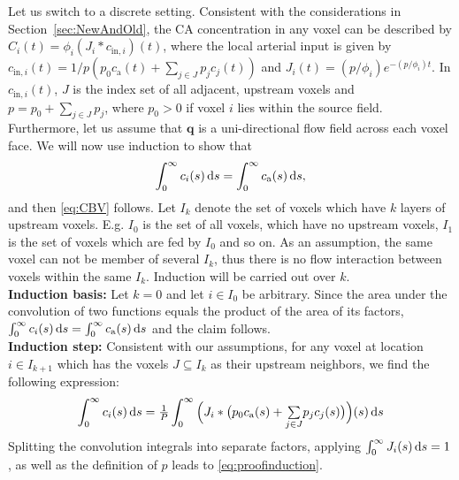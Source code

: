 \documentclass[journal,twocolumn]{IEEEtran}
\newcommand{\ca}{c_\mathrm{a}}
\newcommand{\vq}{\mathbf{q}}
\begin{document}
	Let us switch to a discrete setting.
	Consistent with the considerations in Section~\ref{sec:NewAndOld}, the CA concentration in any voxel can be described by $C_i(t) = \phi_i(J_i\ast c_{\mathrm{in},i})(t)$, where the local arterial input is given by
		$c_{\mathrm{in},i}(t) =1/p(p_0 \ca(t) + \sum_{j \in J} p_jc_j(t))$ and $J_i(t)=(p/\phi_i)e^{- (p/\phi_i)t}$.
	In $c_{\mathrm{in},i}(t)$, $J$ is the index set of all adjacent, upstream voxels and $p=p_0 + \sum_{j\in J} p_j$, where $p_0>0$ if voxel $i$ lies within the source field.
	Furthermore, let us assume that $\vq$ is a uni-directional flow field across each voxel face.
		We will now use induction to show that 
		\begin{equation}
		\int_0^\infty c_i(s) \diffint s = \int_0^\infty \ca(s) \diffint s,
		\label{eq:proofinduction}
		\end{equation} 
		and then \eqref{eq:CBV} follows.
		Let $I_k$ denote the set of voxels which have $k$ layers of upstream voxels.
		E.g. $I_0$ is the set of all voxels, which have no upstream voxels, $I_1$ is the set of voxels which are fed by $I_0$ and so on. As an assumption, the same voxel can not be member of several $I_k$, thus there is no flow interaction between voxels within the same $I_k$.
		Induction will be carried out over $k$.\\
		\textbf{Induction basis:}
		Let $k=0$ and let $i \in I_0$ be arbitrary.
		Since the area under the convolution of two functions equals the product of the area of its factors, $\int_0^\infty c_i(s) \diffint s = \int_0^\infty \ca(s) \diffint s$ and the claim follows.\\
		\textbf{Induction step:}
		Consistent with our assumptions, for any voxel at location $i \in I_{k+1}$ which has the voxels $J \subseteq I_{k}$ as their upstream neighbors, we find the following expression:
		\begin{equation}
			\int_0^\infty c_i(s) \diffint s = \tfrac{1}{P}\int_0^\infty \Big(J_i\ast \big( p_0 \ca(s) + {\textstyle\sum\limits_{j \in J}}p_j c_j(s) \big)\Big)(s) \diffint s
		\end{equation}
		 Splitting the convolution integrals into separate factors, applying $\int_0^{\infty}J_i(s)\,\mathrm{d} s = 1$, as well as the definition of $p$ leads to \eqref{eq:proofinduction}.
	
\end{document}

